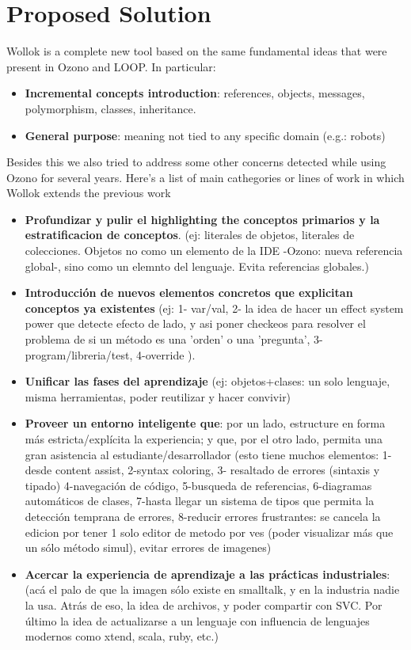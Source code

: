 \section{Proposed Solution}
\label{sec:contribution}


Wollok is a complete new tool based on the same fundamental ideas that were present in Ozono and LOOP. In particular:

\begin{itemize}
\item \textbf{Incremental concepts introduction}: references, objects, messages, polymorphism, classes, inheritance.
\item \textbf{General purpose}: meaning not tied to any specific domain (e.g.: robots)
\end{itemize}

Besides this we also tried to address some other concerns detected while using Ozono for several years. Here's a list of main cathegories or lines of work in which Wollok extends the previous work

\begin{itemize}
\item \textbf{Profundizar y pulir el highlighting the conceptos primarios y la
estratificacion de conceptos}.
	(ej: literales de objetos, literales de colecciones. Objetos no como un
	elemento de la IDE -Ozono: nueva referencia global-, sino como un elemnto del
	lenguaje. Evita referencias globales.)
\item \textbf{Introducción de nuevos elementos concretos que explicitan
conceptos ya existentes} (ej: 1- var/val, 2- la idea de hacer un effect system
power que detecte efecto de lado, y asi poner checkeos para resolver el problema de si un método es una 'orden' o una 'pregunta', 3- program/libreria/test, 4-override ).
\item \textbf{Unificar las fases del aprendizaje} (ej: objetos+clases: un solo
lenguaje, misma herramientas, poder reutilizar y hacer convivir)
\item \textbf{Proveer un entorno inteligente que}: por un lado, estructure en
forma más estricta/explícita la experiencia; y que, por el otro lado, permita una gran asistencia al estudiante/desarrollador (esto tiene muchos elementos: 1- desde content assist, 2-syntax coloring, 3- resaltado de errores (sintaxis y tipado) 4-navegación de código, 5-busqueda de referencias, 6-diagramas automáticos de clases, 7-hasta llegar un sistema de tipos que permita la detección temprana de errores, 8-reducir errores frustrantes: se cancela la edicion por tener 1 solo editor de metodo por ves (poder visualizar más que un sólo método simul), evitar errores de imagenes)
\item \textbf{Acercar la experiencia de aprendizaje a las prácticas
industriales}: (acá el palo de que la imagen sólo existe en smalltalk, y en la
industria nadie la usa. Atrás de eso, la idea de archivos, y poder compartir con SVC. Por último la idea de actualizarse a un lenguaje con influencia de lenguajes modernos como xtend, scala, ruby, etc.)
\end{itemize}